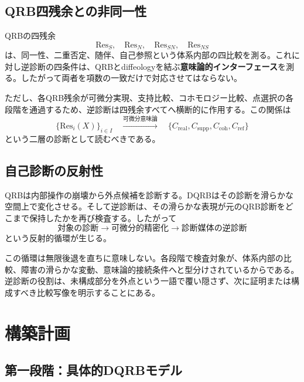 \documentclass[a4paper,11pt]{ltjsarticle}
\theoremstyle{definition}
\theoremstyle{plain}
\newcommand{\Res}{\mathrm{Res}}
\begin{document}
\subsection{QRB四残余との非同一性}

QRBの四残余
\begin{equation}
 \Res_S,\quad\Res_N,\quad
 \Res_{SN},\quad\Res_{NS}
\end{equation}
は、同一性、二重否定、随伴、自己参照という体系内部の四比較を測る。これに対し逆診断の四条件は、QRBとdiffeologyを結ぶ\textbf{意味論的インターフェース}を測る。したがって両者を項数の一致だけで対応させてはならない。

ただし、各QRB残余が可微分実現、支持比較、コホモロジー比較、点選択の各段階を通過するため、逆診断は四残余すべてへ横断的に作用する。この関係は
\begin{equation}
 \{\Res_i(X)\}_{i\in I}
 \quad\xrightarrow{\text{可微分意味論}}\quad
 \{C_{\mathrm{real}},C_{\mathrm{supp}},
 C_{\mathrm{coh}},C_{\mathrm{ref}}\}
\end{equation}
という二層の診断として読むべきである。

\subsection{自己診断の反射性}

QRBは内部操作の崩壊から外点候補を診断する。DQRBはその診断を滑らかな空間上で変化させる。そして逆診断は、その滑らかな表現が元のQRB診断をどこまで保持したかを再び検査する。したがって
\begin{equation}
 \text{対象の診断}
 \longrightarrow
 \text{可微分的精密化}
 \longrightarrow
 \text{診断媒体の逆診断}
 \label{eq:reflexive-diagnosis}
\end{equation}
という反射的循環が生じる。

この循環は無限後退を直ちに意味しない。各段階で検査対象が、体系内部の比較、障害の滑らかな変動、意味論的接続条件へと型分けされているからである。逆診断の役割は、未構成部分を外点という一語で覆い隠さず、次に証明または構成すべき比較写像を明示することにある。

\section{構築計画}

\subsection{第一段階：具体的DQRBモデル}
\end{document}
